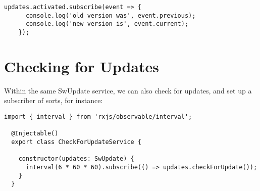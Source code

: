 \begin{lstlisting}[caption=app.routing.module.ts file]
    updates.activated.subscribe(event => {
      console.log('old version was', event.previous);
      console.log('new version is', event.current);
    });
\end{lstlisting}

\section{ Checking for Updates }
Within the same SwUpdate service, we can also check for updates, and set up a
subscriber of sorts, for instance:
\begin{lstlisting}[caption=app.routing.module.ts file]
  import { interval } from 'rxjs/observable/interval';

  @Injectable()
  export class CheckForUpdateService {

    constructor(updates: SwUpdate) {
      interval(6 * 60 * 60).subscribe(() => updates.checkForUpdate());
    }
  }
\end{lstlisting}
